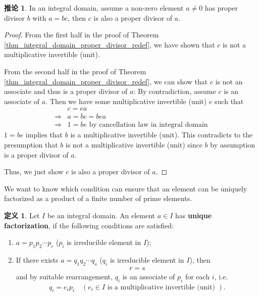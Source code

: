 \documentclass[utf8]{ctexbook}
\theoremstyle{definition}
\newtheorem{protodefinition}{定义}[section]
\newenvironment{definition}
   {\colorlet{shadecolor}{black!15}\begin{shaded}\begin{protodefinition}}
   {\end{protodefinition}\end{shaded}}
\newtheorem{corollary}{推论}[section]
\begin{document}
\begin{corollary}\label{corollary_integral_domain_proper_divisor_redef}
In an integral domain, assume a non-zero element $a \neq 0$ has proper divisor $b$ with $a = bc$, then $c$ is also a proper divisor of $a$.
\end{corollary}

\begin{proof}
From the first half in the proof of Theorem \ref{thm_integral_domain_proper_divisor_redef}, we have shown that $c$ is not a multiplicative invertible (unit).

From the second half in the proof of Theorem \ref{thm_integral_domain_proper_divisor_redef}, we can show that $c$ is not an associate and thus is a proper divisor of $a$: By contradiction, assume $c$ is an associate of $a$. Then we have some multiplicative invertible (unit) $e$ such that
\begin{align*}
& c = e a \\
\Longrightarrow & a = b c = b e a \\
\Longrightarrow & 1 = b e \mbox{ by cancellation law in integral domain}
\end{align*}
$ 1 = be $ implies that $b$ is a multiplicative invertible (unit). This contradicts to the presumption that $b$ is not a multiplicative invertible (unit) since $b$ by assumption is a proper divisor of $a$.

Thus, we just show $c$ is also a proper divisor of $a$.
\end{proof}

We want to know which condition can ensure that an element can be uniquely factorized as a product of a finite number of prime elements.

\begin{definition}\label{def_integral_domain_unique_factorization}
Let $I$ be an integral domain. An element $a \in I$ has \textbf{unique factorization}, if the following conditions are satisfied:
\begin{enumerate}
\item{$a = p_1 p_2 \cdots p_r$ ($p_i$ is irreducible element in $I$);}
\item{If there exists $a = q_1 q_2 \cdots q_s$ ($q_i$ is irreducible element in $I$), then
\begin{align*}
r = s
\end{align*}
and by suitable rearrangement, $q_i$ is an associate of $p_i$ for each $i$, i.e.
\begin{align*}
q_i = e_i p_i \quad ( e_i \in I \mbox{ is a multiplicative invertible (unit) } ).
\end{align*}  
}
\end{enumerate}
\end{definition}
\end{document}
